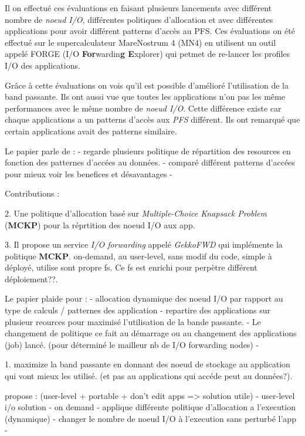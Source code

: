 \documentclass[10pt, a4paper]{article}
\begin{document}
Il on effectué ces évaluations en faisant plusieurs lancements avec différent nombre de \emph{noeud I/O}, différentes politiques d'allocation et avec différentes applications pour avoir différent patterns d'accès au PFS. Ces évaluations on été effectué sur le supercalculateur MareNostrum 4 (MN4) en utilisent un outil appelé FORGE (I/O \textbf{For}wardin\textbf{g E}xplorer) qui petmet de re-lancer les profiles I/O des applications.

Grâce à cette évaluations on vois qu'il est possible d'amélioré l'utilisation de la band passante.
Ils ont aussi vue que toutes les applications n'on pas les même performances avec le même nombre de \emph{noeud I/O}. Cette différence existe car chaque applications a un patterns d'accès aux \emph{PFS} différent. Ils ont remarqué que certain applications avait des patterns similaire.


Le papier parle de :
- regarde plusieurs politique de répartition des resources en fonction des patternes d'accées au données.
- comparé différent patterns d'accées pour mieux voir les benefices et désavantages
- 

Contributions :

2. Une politique d'allocation basé sur \emph{Multiple-Choice Knapsack Problem} (\textbf{MCKP}) pour la réprtition des noeud I/O aux app.

3. Il propose un service \emph{I/O forwarding} appelé \emph{GekkoFWD} qui implémente la politique \textbf{MCKP}. on-demand, au user-level, sans modif du code, simple à déployé, utilise sont propre fs.
Ce fs est enrichi pour perpètre différent déploiement??.

Le papier plaide pour :
- allocation dynamique des noeud I/O par rapport au type de calculs / patternes des application
- repartire des applications sur plusieur reources pour maximisé l'utilisation de la bande passante.
- Le changement de politique ce fait au démarrage ou au changement des applications (job) lancé. (pour déterminé le mailleur nb de I/O forwarding nodes)
- 

1. maximize la band passante en donnant des noeud de stockage au application qui vont mieux les utilisé. (et pas au applications qui accéde peut au données?).

propose : (user-level + portable + don't edit apps => solution utile)
- user-level i/o solution
- on demand
- applique différente politique d'allocation a l'execution (dynamique)
- changer le nombre de noeud I/O à l'execution sans perturbé l'app
-
\end{document}
